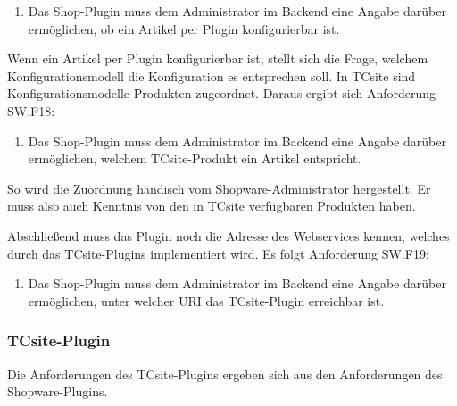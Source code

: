 \documentclass[11pt, a4paper, titlepage, listof=totoc, bibliography=totoc, index=totoc, twoside, openright, headings=normal, draft]{scrreprt}
\begin{document}
\begin{enumerate}[SW.F17:]\bfseries
\item Das Shop-Plugin muss dem Administrator im Backend eine Angabe darüber ermöglichen, ob ein Artikel per Plugin konfigurierbar ist.
\end{enumerate}
Wenn ein Artikel per Plugin konfigurierbar ist, stellt sich die Frage, welchem Konfigurationsmodell die Konfiguration es entsprechen soll. In TCsite sind Konfigurationsmodelle Produkten zugeordnet. Daraus ergibt sich Anforderung SW.F18:
\begin{enumerate}[SW.F18:]\bfseries
\item Das Shop-Plugin muss dem Administrator im Backend eine Angabe darüber ermöglichen, welchem TCsite-Produkt ein Artikel entspricht.
\end{enumerate}
So wird die Zuordnung händisch vom Shopware-Administrator hergestellt. Er muss also auch Kenntnis von den in TCsite verfügbaren Produkten haben.

Abschließend muss das Plugin noch die Adresse des Webservices kennen, welches durch das TCsite-Plugins implementiert wird. Es folgt Anforderung SW.F19:
\begin{enumerate}[SW.F19:]\bfseries
\item Das Shop-Plugin muss dem Administrator im Backend eine Angabe darüber ermöglichen, unter welcher URI das TCsite-Plugin erreichbar ist.
\end{enumerate}

\subsubsection{TCsite-Plugin}
Die Anforderungen des TCsite-Plugins ergeben sich aus den Anforderungen des Shopware-Plugins.
\end{document}
